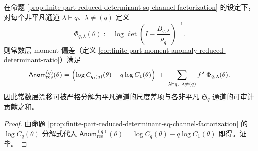 \begin{corollary}\label{cor:finite-part-moment-anomaly-channel-additivity}
在命题 \ref{prop:finite-part-reduced-determinant-sq-channel-factorization} 的设定下，
对每个非平凡通道 \(\lambda\vdash q\)、\(\lambda\neq(q)\) 定义
\[
\Phi_{q,\lambda}(\theta)
:=
\log\det\!\left(I-\frac{B_{q,\lambda}}{\rho_q}\right)^{-1}.
\]
则常数层 moment 偏差（定义 \ref{cor:finite-part-moment-anomaly-reduced-determinant-ratio}）满足
\[
\mathsf{Anom}^{(q)}_{\mathrm{res}}(\theta)
=
\Bigl(\log C_{q,(q)}(\theta)-q\log C_1(\theta)\Bigr)
\;+\;
\sum_{\lambda\vdash q,\ \lambda\neq(q)} f^\lambda\,\Phi_{q,\lambda}(\theta).
\]
因此常数层漂移可被严格分解为平凡通道的尺度差项与各非平凡 \(\mathfrak{S}_q\) 通道的可审计贡献之和。
\end{corollary}
\begin{proof}
由命题 \ref{prop:finite-part-reduced-determinant-sq-channel-factorization} 的 \(\log C_q(\theta)\) 分解式代入
\(
\mathsf{Anom}^{(q)}_{\mathrm{res}}(\theta)=\log C_q(\theta)-q\log C_1(\theta)
\)
即得。证毕。
\end{proof}

